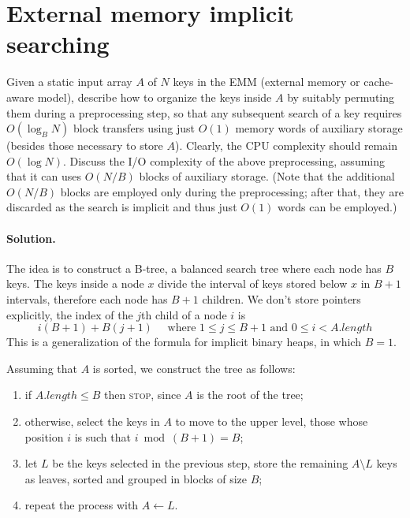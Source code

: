 \section{External memory implicit searching}
Given a static input array $A$ of $N$ keys in the EMM (external memory or cache-aware model), describe how to organize the keys inside $A$ by suitably permuting them during a preprocessing step, so that any subsequent search of a key requires $O(\log_B N)$ block transfers using just $O(1)$ memory words of auxiliary storage (besides those necessary to store $A$). Clearly, the CPU complexity should remain $O(\log N)$. Discuss the I/O complexity of the above preprocessing, assuming that it can uses $O(N/B)$ blocks of auxiliary storage. (Note that the additional $O(N/B)$ blocks are employed only during the preprocessing; after that, they are discarded as the search is implicit and thus just $O(1)$ words can be employed.)

\vspace{0.5cm}
\paragraph{Solution.} The idea is to construct a B-tree, a balanced search tree where each node has $B$ keys. The keys inside a node $x$ divide the interval of keys stored below $x$ in $B+1$ intervals, therefore each node has $B+1$ children. We don't store pointers explicitly, the index of the $j$th child of a node $i$ is
$$i(B+1)+B(j+1) \quad \text{ where } 1 \leq j \leq B+1 \text{ and } 0 \leq i < A.length$$
This is a generalization of the formula for implicit binary heaps, in which $B=1$.

Assuming that $A$ is sorted, we construct the tree as follows:
\begin{enumerate}
  \item if $A.length \leq B$ then \textsc{stop}, since $A$ is the root of the tree;
  \item otherwise, select the keys in $A$ to move to the upper level, those whose position $i$ is such that $i \bmod (B+1) = B$;
  \item let $L$ be the keys selected in the previous step, store the remaining $A \setminus L$ keys as leaves, sorted and grouped in blocks of size $B$;
  \item repeat the process with $A \gets L$.
\end{enumerate}

